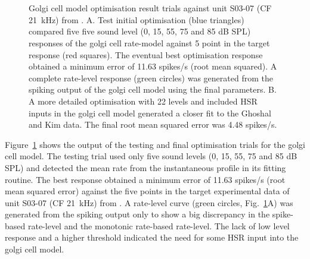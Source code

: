 \begin{figure}[htb]
  \centering
  \hspace{2pt}\hspace{0.5\textwidth}\hfill\\
   \\
  \caption{Golgi cell model optimisation result trials against unit
    S03-07 (CF 21~kHz) from \citep{GhoshalKim:1996}. A. Test initial
    optimisation (blue triangles) compared five five sound level (0,
    15, 55, 75 and 85 dB SPL) responses of the golgi cell rate-model
    against 5 point in the target response (red squares). The eventual
    best optimisation response obtained a minimum error of 11.63
    spikes/s (root mean squared). A complete rate-level response
    (green circles) was generated from the spiking output of the golgi
    cell model using the final parameters. B. A more detailed
    optimisation with 22 levels and included HSR inputs in the golgi
    cell model generated a closer fit to the Ghoshal and Kim data.
    The final root mean squared error was 4.48 spikes/s.
  }\label{fig:GolgiResult}
\end{figure}



Figure~\ref{fig:GolgiResult} shows the output of the testing and final optimisation trials
for the golgi cell model.  The testing trial used only five sound levels (0, 15,
55, 75 and 85 dB SPL) and detected the mean rate from the instantaneous profile
in its fitting routine. The best response obtained a minimum error of 11.63
spikes/s (root mean squared error) against the five points in the target
experimental data of unit S03-07 (CF 21~kHz) from \citep{GhoshalKim:1996}. A
rate-level curve (green circles, Fig.~\ref{fig:GolgiResult}A) was generated from the spiking output only to
show a big discrepancy in the spike-based rate-level and the monotonic
rate-based rate-level. The lack of low level response and a higher threshold
indicated the need for some HSR input into the golgi cell model.  

